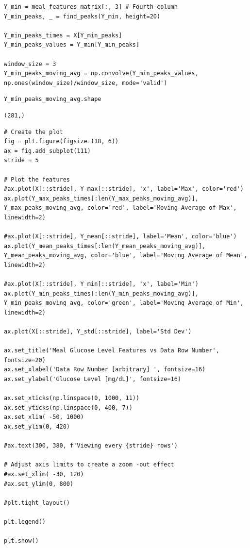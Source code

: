 \begin{verbatim}
Y_min = meal_features_matrix[:, 3] # Fourth column
Y_min_peaks, _ = find_peaks(Y_min, height=20)

Y_min_peaks_times = X[Y_min_peaks]
Y_min_peaks_values = Y_min[Y_min_peaks]

window_size = 3
Y_min_peaks_moving_avg = np.convolve(Y_min_peaks_values, np.ones(window_size)/window_size, mode='valid')
\end{verbatim}

\begin{verbatim}
Y_min_peaks_moving_avg.shape
\end{verbatim}

\begin{verbatim}
(281,)
\end{verbatim}

\begin{verbatim}
# Create the plot
fig = plt.figure(figsize=(18, 6))
ax = fig.add_subplot(111)
stride = 5

# Plot the features
#ax.plot(X[::stride], Y_max[::stride], 'x', label='Max', color='red')
ax.plot(Y_max_peaks_times[:len(Y_max_peaks_moving_avg)], Y_max_peaks_moving_avg, color='red', label='Moving Average of Max', linewidth=2)

#ax.plot(X[::stride], Y_mean[::stride], label='Mean', color='blue')
ax.plot(Y_mean_peaks_times[:len(Y_mean_peaks_moving_avg)], Y_mean_peaks_moving_avg, color='blue', label='Moving Average of Mean', linewidth=2)

#ax.plot(X[::stride], Y_min[::stride], 'x', label='Min')
ax.plot(Y_min_peaks_times[:len(Y_min_peaks_moving_avg)], Y_min_peaks_moving_avg, color='green', label='Moving Average of Min', linewidth=2)

ax.plot(X[::stride], Y_std[::stride], label='Std Dev')

ax.set_title('Meal Glucose Level Features vs Data Row Number', fontsize=20)
ax.set_xlabel('Data Row Number [arbitrary] ', fontsize=16)
ax.set_ylabel('Glucose Level [mg/dL]', fontsize=16)

ax.set_xticks(np.linspace(0, 1000, 11))
ax.set_yticks(np.linspace(0, 400, 7))
ax.set_xlim( -50, 1000)
ax.set_ylim(0, 420)

#ax.text(300, 380, f'Viewing every {stride} rows')

# Adjust axis limits to create a zoom -out effect
#ax.set_xlim( -30, 120)
#ax.set_ylim(0, 800)

#plt.tight_layout()

plt.legend()

plt.show()
\end{verbatim}


